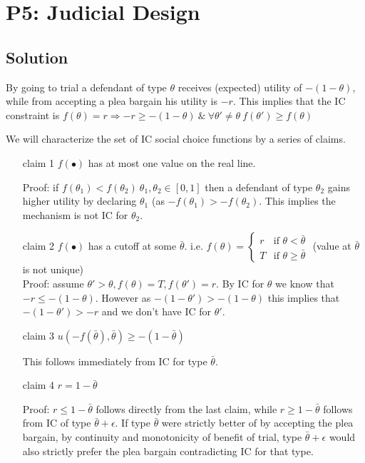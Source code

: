 \documentclass{article}
\newcommand{\enterProblemHeader}[1]{
\nobreak\extramarks{#1}{#1 continued on next page\ldots}\nobreak
\nobreak\extramarks{#1 (continued)}{#1 continued on next page\ldots}\nobreak
}
\newcommand{\exitProblemHeader}[1]{
\nobreak\extramarks{#1 (continued)}{#1 continued on next page\ldots}\nobreak
\nobreak\extramarks{#1}{}\nobreak
}
\newcounter{homeworkProblemCounter} %
\newcommand{\homeworkProblemName}{}
\newenvironment{ex}[1][Problem \arabic{homeworkProblemCounter}]{ %
\stepcounter{homeworkProblemCounter} %
\renewcommand{\homeworkProblemName}{#1} %
\section{\homeworkProblemName} %
}{
}
\newif\ifsolutions
\begin{document}
\begin{ex}[P5: Judicial Design]
	\ifsolutions
	\subsection*{Solution}
	By going to trial a defendant of type $\theta$ receives (expected) utility of $-(1-\theta)$, while from accepting a plea bargain his utility is $-r$. This implies that the IC constraint is $f(\theta)=r \Rightarrow -r\geq -(1-\theta) ~\&~ \forall \theta' \neq \theta ~ f(\theta') \geq f(\theta)$
	

	We will characterize the set of IC social choice functions by a series of claims. 

	\begin{itemize}

		\item[claim 1] $f(\bullet)$ has at most one value on the real line.
		
		Proof: if $f(\theta_1)<f(\theta_2) ~\theta_1,\theta_2 \in [0,1]$ then a defendant of type $\theta_2$ gains higher utility by declaring $\theta_1$ (as $-f(\theta_1)>-f(\theta_2)$. This implies the mechanism is not IC for $\theta_2$.

		\item[claim 2] $f(\bullet)$ has a cutoff at some $\bar{\theta}$. i.e. $f(\theta)= \begin{cases} r & \text{if } \theta<\bar{\theta}
		\\
		T & \text{if } \theta\geq\bar{\theta} \end{cases}$ (value at $\bar{\theta}$ is not unique)\\

		Proof: assume $\theta'>\theta , f(\theta)=T, f(\theta')=r$. By IC for $\theta$ we know that $-r\leq -(1-\theta)$. However as $-(1-\theta')>-(1-\theta)$ this implies that $-(1-\theta')>-r$ and we don't have IC for $\theta'$.
		
		\item[claim 3] $u(-f(\bar{\theta}),\bar{\theta})\geq -(1-\bar{\theta})$
		
		This follows immediately from IC for type $\bar{\theta}$.
		
		\item[claim 4] $r= 1-\bar{\theta}$
		
		Proof: $r\leq 1-\bar{\theta}$ follows directly from the last claim, while $r\geq 1-\bar{\theta}$ follows from IC of type $\bar{\theta}+\epsilon$. If type $\bar{\theta}$ were strictly better of by accepting the plea bargain, by continuity and monotonicity of benefit of trial, type $\bar{\theta}+\epsilon$ would also strictly prefer the plea bargain contradicting IC for that type.


\end{itemize}
\end{ex}
\end{document}
